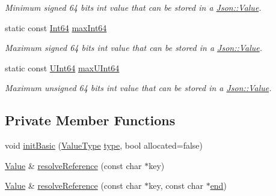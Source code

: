 \begin{DoxyCompactItemize}
\begin{DoxyCompactList}\small\item\em Minimum signed 64 bits int value that can be stored in a \hyperlink{classJson_1_1Value}{Json\+::\+Value}. \end{DoxyCompactList}\item 
static const \hyperlink{classJson_1_1Value_a1b86af9f85f0f1baa972c3319fa22695}{Int64} \hyperlink{classJson_1_1Value_a4492634870b8c5709ce967b384ac6006}{max\+Int64}
\begin{DoxyCompactList}\small\item\em Maximum signed 64 bits int value that can be stored in a \hyperlink{classJson_1_1Value}{Json\+::\+Value}. \end{DoxyCompactList}\item 
static const \hyperlink{classJson_1_1Value_a8b62564be8c087c6d18de180ff4e13e3}{U\+Int64} \hyperlink{classJson_1_1Value_ae1eb89c305c39516696ff305cffa01da}{max\+U\+Int64}
\begin{DoxyCompactList}\small\item\em Maximum unsigned 64 bits int value that can be stored in a \hyperlink{classJson_1_1Value}{Json\+::\+Value}. \end{DoxyCompactList}\end{DoxyCompactItemize}
\subsection*{Private Member Functions}
\begin{DoxyCompactItemize}
\item 
void \hyperlink{classJson_1_1Value_a32b86b71564157f40f880f5736be822a}{init\+Basic} (\hyperlink{namespaceJson_a7d654b75c16a57007925868e38212b4e}{Value\+Type} \hyperlink{classJson_1_1Value_a695ef31fad36b4712918b3ff80158479}{type}, bool allocated=false)
\item 
\hyperlink{classJson_1_1Value}{Value} \& \hyperlink{classJson_1_1Value_a9ff9cdae2c8f4155bab603d750b0b3f1}{resolve\+Reference} (const char $\ast$key)
\item 
\hyperlink{classJson_1_1Value}{Value} \& \hyperlink{classJson_1_1Value_a5f6b3aaf4f2e952a33dd823db008c333}{resolve\+Reference} (const char $\ast$key, const char $\ast$\hyperlink{classJson_1_1Value_a596da1926b2f2a4056bff2edb713eb0b}{end})
\end{DoxyCompactItemize}
